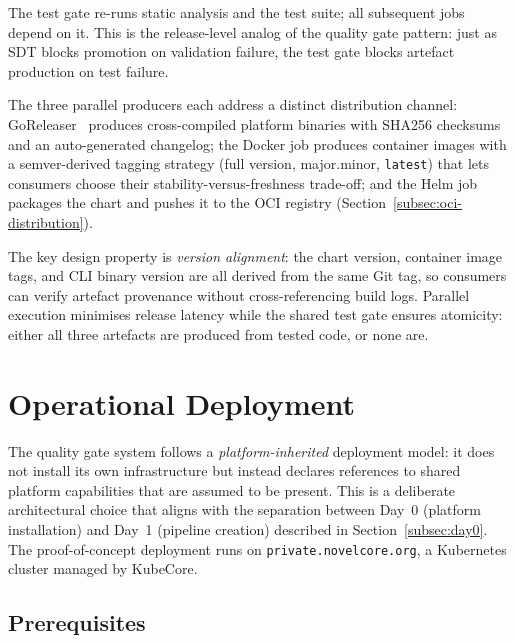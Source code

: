 The test gate re-runs static analysis and the test suite; all subsequent jobs depend on it. This is the release-level analog of the quality gate pattern: just as SDT blocks promotion on validation failure, the test gate blocks artefact production on test failure.

The three parallel producers each address a distinct distribution channel: GoReleaser~\cite{goreleaser} produces cross-compiled platform binaries with SHA256 checksums and an auto-generated changelog; the Docker job produces container images with a semver-derived tagging strategy (full version, major.minor, \texttt{latest}) that lets consumers choose their stability-versus-freshness trade-off; and the Helm job packages the chart and pushes it to the OCI registry (Section~\ref{subsec:oci-distribution}).

The key design property is \textit{version alignment}: the chart version, container image tags, and CLI binary version are all derived from the same Git tag, so consumers can verify artefact provenance without cross-referencing build logs. Parallel execution minimises release latency while the shared test gate ensures atomicity: either all three artefacts are produced from tested code, or none are.

\section{Operational Deployment}
\label{sec:operational-deployment}

The quality gate system follows a \textit{platform-inherited} deployment model: it does not install its own infrastructure but instead declares references to shared platform capabilities that are assumed to be present. This is a deliberate architectural choice that aligns with the separation between Day~0 (platform installation) and Day~1 (pipeline creation) described in Section~\ref{subsec:day0}. The proof-of-concept deployment runs on \texttt{private.novelcore.org}, a Kubernetes cluster managed by KubeCore.

\subsection{Prerequisites}
\label{subsec:prerequisites}


